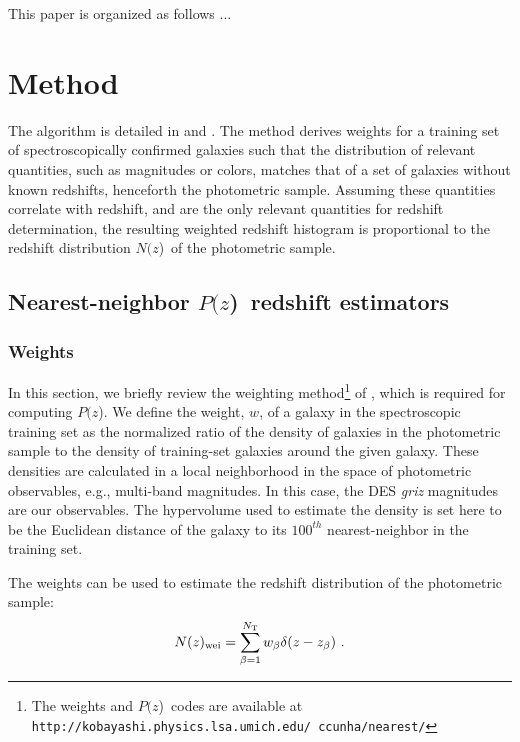 \documentclass[preprint]{aastex}
\newcommand{\pofz}{$P(z$)}
\newcommand{\Nofz}{$N(z$)}
\newcommand{\nwei}{N(z)_{\rm wei}}
\begin{document}
This paper is organized as follows ...

\section{Method} \label{sec:method}

The algorithm is detailed in \citet{LimaPhotoz08} and \citet{CunhaPhotoz09}.
The method derives weights for a training set of spectroscopically confirmed
galaxies such that the distribution of relevant quantities, such as magnitudes
or colors, matches that of a %
set of galaxies without known redshifts, henceforth the photometric sample.
Assuming these quantities correlate with redshift, and are the only relevant
quantities for redshift determination, the resulting weighted redshift
histogram is proportional to the redshift %
distribution \Nofz\ of the photometric sample. 

\subsection{Nearest-neighbor \pofz\ redshift estimators}\label{sec:nnpz}

\subsubsection{Weights}

In this section, we briefly review the weighting method\footnote{The weights and \pofz\
codes are available at \tt http://kobayashi.physics.lsa.umich.edu/~ccunha/nearest/} of \cite{LimaPhotoz08}, which
is required for computing \pofz.  We define the weight, $w$, of a galaxy in
the spectroscopic training set as the normalized ratio of the density of
galaxies in the photometric sample to the density of training-set galaxies
around the given galaxy.  These densities are calculated in a local
neighborhood in the space of photometric observables, e.g., multi-band
magnitudes.  In this case, the DES {\it griz} magnitudes are our observables.
The hypervolume used to estimate the density is set here to be the Euclidean
distance of the galaxy to its $100^{th}$ nearest-neighbor in the training set.

The weights can be used to estimate the redshift distribution of the
photometric sample:
\begin{equation}  
\nwei = \sum_{\beta=1}^{N_{\rm T}} w_\beta \delta(z-z_\beta)~.
\label{eqn:Nzest}
\end{equation}

\end{document}
